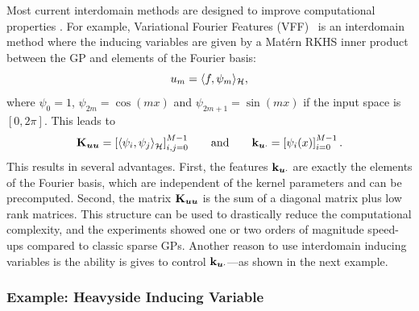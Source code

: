 Most current interdomain methods are designed to improve computational properties \citep{hensman2017variational,burt2020variational,Dutordoir2020spherical}. For example, Variational Fourier Features (VFF)~\citep{hensman2017variational} is an interdomain method where the inducing variables are given by a Mat\'ern RKHS inner product between the GP and elements of the Fourier basis:
\begin{equation*}
u_m = \langle f, \psi_m \rangle_{{\mathcal{H}}},
\end{equation*}
where $\psi_0 = 1$, $\psi_{2m}=\cos(m x)$ and $\psi_{2m+1}=\sin(m x)$ if the input space is $[0, 2 \pi]$. This leads to
\begin{equation*}
    \Kuu = \left[\langle \psi_i , \psi_{j} \rangle_\rkhs^{} \right]_{i, j = 0}^{M-1}\qquad\text{and}\qquad\kux = \left[ \psi_i(x)\right]_{i = 0}^{M-1}\, .
\end{equation*}
This results in several advantages. First, the features $\mathbf{k}_{\bm{u} \cdot}$ are exactly the elements of the Fourier basis, which are independent of the kernel parameters and can be precomputed. Second, the matrix $\mathbf{{K}}_{\bm{u} \bm{u}}$ is the sum of a diagonal matrix plus low rank matrices. This structure can be used to drastically reduce the computational complexity, and the experiments showed one or two orders of magnitude speed-ups compared to classic sparse GPs. Another reason to use interdomain inducing variables is the ability is gives to control $\mathbf{k}_{\bm{u} \cdot}$---as shown in the next example.

\subsubsection*{Example: Heavyside Inducing Variable}


